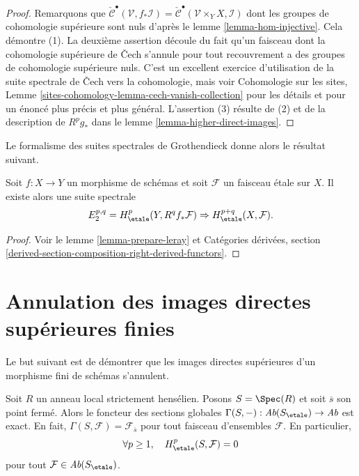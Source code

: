 \begin{proof}
Remarquons que $\check{\mathcal{C}}^\bullet(\mathcal{V}, f_*\mathcal{I}) =
\check{\mathcal{C}}^\bullet(\mathcal{V} \times_Y X, \mathcal{I})$
dont les groupes de cohomologie sup\'erieure sont nuls d'apr\`es le lemme \ref{lemma-hom-injective}.
Cela d\'emontre (1). La deuxi\`eme assertion d\'ecoule du fait qu'un faisceau dont
la cohomologie sup\'erieure de {\v C}ech s'annule pour tout recouvrement a des groupes de
cohomologie sup\'erieure nuls. C'est un excellent exercice d'utilisation de la
suite spectrale de {\v C}ech vers la cohomologie, mais voir
Cohomologie sur les sites, Lemme \ref{sites-cohomology-lemma-cech-vanish-collection}
pour les d\'etails et pour un \'enonc\'e plus pr\'ecis et plus g\'en\'eral.
L'assertion (3) r\'esulte de (2) et de la description de
$R^pg_*$ dans le lemme \ref{lemma-higher-direct-images}.
\end{proof}

\noindent
Le formalisme des suites spectrales de Grothendieck donne alors le
r\'esultat suivant.

\begin{proposition}
\label{proposition-leray}
Soit $f: X \to Y$ un morphisme de sch\'emas et soit $\mathcal{F}$ un faisceau \'etale sur
$X$. Il existe alors une suite spectrale
$$
E_2^{p, q} = H_\etale^p(Y, R^qf_*\mathcal{F}) \Rightarrow
H_\etale^{p+q}(X, \mathcal{F}).
$$
\end{proposition}

\begin{proof}
Voir le lemme \ref{lemma-prepare-leray} et
Cat\'egories d\'eriv\'ees, section
\ref{derived-section-composition-right-derived-functors}.
\end{proof}









\section{Annulation des images directes sup\'erieures finies}
\label{section-vanishing-finite-morphism}

\noindent
Le but suivant est de d\'emontrer que les images directes sup\'erieures d'un morphisme fini de
sch\'emas s'annulent.

\begin{lemma}
\label{lemma-vanishing-etale-cohomology-strictly-henselian}
Soit $R$ un anneau local strictement hens\'elien. Posons $S = \Spec(R)$ et soit
$\overline{s}$ son point ferm\'e. Alors le foncteur des
sections globales
$\Gamma(S, -) : \textit{Ab}(S_\etale) \to \textit{Ab}$
est exact. En fait, $\Gamma(S, \mathcal{F}) = \mathcal{F}_{\overline{s}}$
pour tout faisceau d'ensembles $\mathcal{F}$. En particulier,
$$
\forall p\geq 1, \quad H_\etale^p(S, \mathcal{F})=0
$$
pour tout $\mathcal{F}\in \textit{Ab}(S_\etale)$.
\end{lemma}

